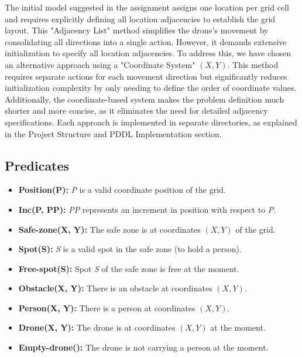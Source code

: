 \documentclass{article}
\begin{document}
\vspace{1em}

\begin{tcolorbox}[colback=gray!10, colframe=black, title=Adjacency List vs. Coordinate System Approaches]
    The initial model suggested in the assignment assigns one location per grid cell and requires explicitly defining all location adjacencies to establish the grid layout. This "Adjacency List" method simplifies the drone's movement by consolidating all directions into a single action. However, it demands extensive initialization to specify all location adjacencies. To address this, we have chosen an alternative approach using a "Coordinate System" \((X, Y)\). This method requires separate actions for each movement direction but significantly reduces initialization complexity by only needing to define the order of coordinate values. Additionally, the coordinate-based system makes the problem definition much shorter and more concise, as it eliminates the need for detailed adjacency specifications. Each approach is implemented in separate directories, as explained in the Project Structure and PDDL Implementation section.
\end{tcolorbox}

\subsection{Predicates}

\begin{itemize}[label=--, itemsep=0.05em]
    \item \textbf{Position(P):} \textit{P} is a valid coordinate position of the grid.
    \item \textbf{Inc(P, PP):} \textit{PP} represents an increment in position with respect to \textit{P}.
    \item \textbf{Safe-zone(X, Y):} The safe zone is at coordinates \((X, Y)\) of the grid.
    \item \textbf{Spot(S):} \textit{S} is a valid spot in the safe zone (to hold a person).
    \item \textbf{Free-spot(S):} Spot \textit{S} of the safe zone is free at the moment.
    \item \textbf{Obstacle(X, Y):} There is an obstacle at coordinates \((X, Y)\).
    \item \textbf{Person(X, Y):} There is a person at coordinates \((X, Y)\).
    \item \textbf{Drone(X, Y):} The drone is at coordinates \((X, Y)\) at the moment.
    \item \textbf{Empty-drone():} The drone is not carrying a person at the moment.
\end{itemize}
\end{document}
